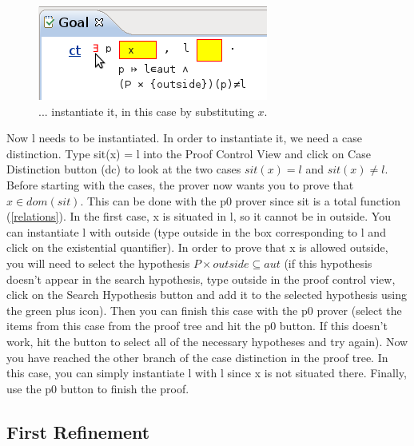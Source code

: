 \begin{figure}[!ht]
\begin{center}
	\includegraphics{img/tutorial/tut_10_instantiate_p.png}
	\caption{... instantiate it, in this case by substituting $x$.}
	\label{fig_tut_10_instantiate_p}
\end{center}
\end{figure}


Now \textsf{l} needs to be instantiated. In order to instantiate it, we need a case distinction. Type sit(x) = l into the \textsf{Proof Control View} and click on \textsf{Case Distinction button (dc)} to look at the two cases $sit(x) = l$ and $sit(x) \neq l$. Before starting with the cases, the prover now wants you to prove that $x \in dom(sit)$. This can be done with the \textsf{p0} prover since \textsf{sit} is a total function (\ref{relations}). In the first case, \textsf{x} is situated in \textsf{l}, so it cannot be in \textsf{outside}. You can instantiate \textsf{l} with \textsf{outside} (type \textsf{outside} in the box corresponding to \textsf{l} and click on the existential quantifier). In order to prove that \textsf{x} is allowed \textsf{outside}, you will need to select the hypothesis $P \times {outside} \subseteq aut$ (if this hypothesis doesn't appear in the search hypothesis, type outside in the proof control view, click on the \textsf{Search Hypothesis button} and add it to the selected hypothesis using the green plus icon). Then you can finish this case with the \textsf{p0} prover (select the items from this case from the proof tree and hit the \textsf{p0} button. If this doesn't work, hit the  button to select all of the necessary hypotheses and try again). Now you have reached the other branch of the case distinction in the proof tree. In this case, you can simply instantiate \textsf{l} with \textsf{l} since 
\textsf{x} is not situated there. Finally, use the \textsf{p0} button to finish the proof. 

\subsection{First Refinement}
\label{tut_location_first_refinement}


